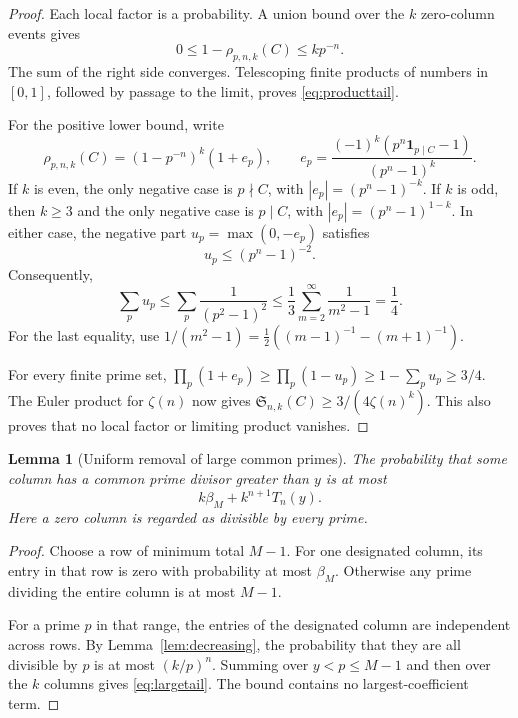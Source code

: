 \documentclass[11pt]{amsart}
\newcommand{\Sseries}{\mathfrak S}
\newcommand{\ind}{\mathbf 1}
\newtheorem{lemma}[theorem]{Lemma}
\theoremstyle{definition}
\theoremstyle{remark}
\begin{document}
\begin{proof}
Each local factor is a probability. A union bound over the $k$ zero-column
events gives
\[
0\le1-\rho_{p,n,k}(C)\le kp^{-n}.
\]
The sum of the right side converges. Telescoping finite products of
numbers in $[0,1]$, followed by passage to the limit, proves
\eqref{eq:producttail}.

For the positive lower bound, write
\[
\rho_{p,n,k}(C)=(1-p^{-n})^k(1+e_p),
\qquad
e_p=\frac{(-1)^k(p^n\ind_{p\mid C}-1)}{(p^n-1)^k}.
\]
If $k$ is even, the only negative case is $p\nmid C$, with
$|e_p|=(p^n-1)^{-k}$. If $k$ is odd, then $k\ge3$ and the only
negative case is $p\mid C$, with $|e_p|=(p^n-1)^{1-k}$.
In either case, the negative part $u_p=\max(0,-e_p)$ satisfies
\[
u_p\le(p^n-1)^{-2}.
\]
Consequently,
\begin{equation}\label{eq:quarter}
\sum_pu_p
\le\sum_p\frac1{(p^2-1)^2}
\le\frac13\sum_{m=2}^{\infty}\frac1{m^2-1}
=\frac14.
\end{equation}
For the last equality, use
$1/(m^2-1)=\tfrac12((m-1)^{-1}-(m+1)^{-1})$.

For every finite prime set,
$\prod_p(1+e_p)\ge\prod_p(1-u_p)\ge1-\sum_pu_p\ge3/4$.
The Euler product for $\zeta(n)$ now gives
$\Sseries_{n,k}(C)\ge3/(4\zeta(n)^k)$.
This also proves that no local factor or limiting product vanishes.
\end{proof}

\begin{lemma}[Uniform removal of large common primes]\label{lem:tail}
The probability that some column has a common prime divisor greater
than $y$ is at most
\begin{equation}\label{eq:largetail}
k\beta_M+k^{n+1}T_n(y).
\end{equation}
Here a zero column is regarded as divisible by every prime.
\end{lemma}

\begin{proof}
Choose a row of minimum total $M-1$. For one designated column, its entry
in that row is zero with probability at most $\beta_M$. Otherwise any
prime dividing the entire column is at most $M-1$.

For a prime $p$ in that range, the entries of the designated column
are independent across rows. By Lemma~\ref{lem:decreasing}, the
probability that they are all divisible by $p$ is at most $(k/p)^n$.
Summing over $y<p\le M-1$ and then over the $k$ columns gives
\eqref{eq:largetail}. The bound contains no largest-coefficient term.
\end{proof}
\end{document}
